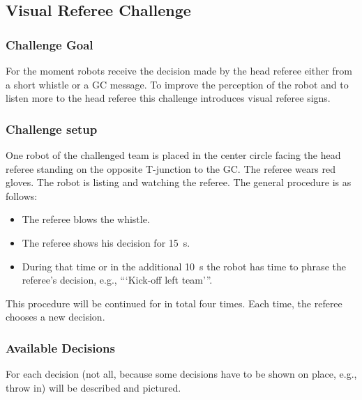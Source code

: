 \subsection{Visual Referee Challenge}

    \subsubsection{Challenge Goal}

        For the moment robots receive the decision made by the head referee either from a short whistle or a GC message. To improve the perception of the robot and to listen more to the head referee this challenge introduces visual referee signs.

    \subsubsection{Challenge setup}

        One robot of the challenged team is placed in the center circle facing the head referee standing on the opposite T-junction to the GC. The referee wears red gloves. The robot is listing and watching the referee. The general procedure is as follows:

        \begin{itemize}
            \item The referee blows the whistle.
            \item The referee shows his decision for \qty{15}{\second}.
            \item During that time or in the additional \qty{10}{\second} the robot has time to phrase the referee's decision, e.g., ```Kick-off left team'''. 
        \end{itemize}

        This procedure will be continued for in total four times. Each time, the referee chooses a new decision.

    \subsubsection{Available Decisions}

        For each decision (not all, because some decisions have to be shown on place, e.g., throw in) will be described and pictured.


